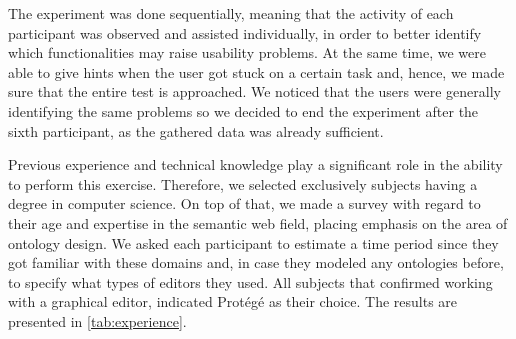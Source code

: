 The experiment was done sequentially, meaning that the activity of each participant was observed and assisted individually, in order to better identify which functionalities may raise usability problems. At the same time, we were able to give hints when the user got stuck on a certain task and, hence, we made sure that the entire test is approached. We noticed that the users were generally identifying the same problems so we decided to end the experiment after the sixth participant, as the gathered data was already sufficient.

Previous experience and technical knowledge play a significant role in the ability to perform this exercise. Therefore, we selected exclusively subjects having a degree in computer science. On top of that, we made a survey with regard to their age and expertise in the semantic web field, placing emphasis on the area of ontology design. We asked each participant to estimate a time period since they got familiar with these domains and, in case they modeled any ontologies before, to specify what types of editors they used. All subjects that confirmed working with a graphical editor, indicated Protégé as their choice.  The results are presented in \autoref{tab:experience}.

